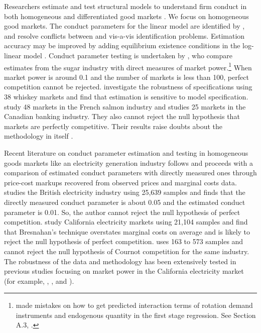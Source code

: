 \documentclass[11pt, a4paper]{article}
\begin{document}
Researchers estimate and test structural models to understand firm conduct in both homogeneous and differentiated good markets \citep{nevoIdentificationOligopolySolution1998, magnolfi2022comparison, duarte2023testing}. 
We focus on homogeneous good markets. 
The conduct parameters for the linear model are identified by \citet{bresnahan1982oligopoly}, and \cite{matsumura2023resolving} resolve conflicts between \cite{bresnahan1982oligopoly} and \cite{perloff2012collinearity} vis-a-vis identification problems. 
Estimation accuracy may be improved by adding equilibrium existence conditions in the log-linear model \citep{matsumura2023mpec}. 
Conduct parameter testing is undertaken by \cite{genesove1998testing}, who compare estimates from the sugar industry with direct measures of market power.\footnote{\cite{genesove1998testing} made mistakes on how to get predicted interaction terms of rotation demand instruments and endogenous quantity in the first stage regression. See Section A.3, \cite{matsumura2023resolving}.} 
When market power is around 0.1 and the number of markets is less than 100, perfect competition cannot be rejected. 
\cite{clay2003further} investigate the robustness of specifications using 38 whiskey markets and find that estimation is sensitive to model specification.
\cite{steen1999testing} study 48 markets in the French salmon industry and \cite{shaffer1993test} studies 25 markets in the Canadian banking industry. 
They also cannot reject the null hypothesis that markets are perfectly competitive. 
Their results raise doubts about the methodology in itself \citep{shafferMarketPowerCompetition2017}.

Recent literature on conduct parameter estimation and testing in homogeneous goods markets like an electricity generation industry follows \cite{genesove1998testing} and proceeds with a comparison of estimated conduct parameters with directly measured ones through price-cost markups recovered from observed prices and marginal costs data. 
\cite{wolfram1999measuring} studies the British electricity industry using 25,639 samples and finds that the directly measured conduct parameter is about 0.05 and the estimated conduct parameter is 0.01. 
So, the author cannot reject the null hypothesis of perfect competition.
\cite{kim2006biases} study California electricity markets using 21,104 samples and find that Bresnahan's technique overstates marginal costs on average and is likely to reject the null hypothesis of perfect competition.
\cite{puller2007pricing} uses 163 to 573 samples and cannot reject the null hypothesis of Cournot competition for the same industry.
The robustness of the data and methodology has been extensively tested in previous studies focusing on market power in the California electricity market (for example, \cite{borenstein2002measuring}, \cite{wolak2003measuring}, and \cite{orea2018estimating}).
\end{document}
